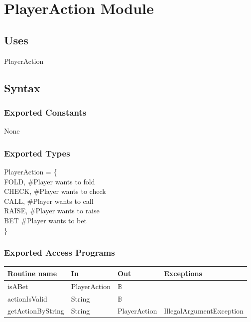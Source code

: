 \documentclass[12pt, titlepage]{article}
\begin{document}
                      
        
\section* {PlayerAction Module}
    \subsection* {Uses}
    PlayerAction
    \subsection* {Syntax}
    
        \subsubsection* {Exported Constants}
            None
        \subsubsection* {Exported Types}
            PlayerAction = \{ \\
            FOLD, \#Player wants to fold \\
            CHECK, \#Player wants to check \\
            CALL, \#Player wants to call \\
            RAISE, \#Player wants to raise \\
            BET \#Player wants to bet \\
            \}

        \subsubsection* {Exported Access Programs}
        
        \begin{tabular}{| l | l | l | p{6cm} |}
            \hline
            \textbf{Routine name} & \textbf{In} & \textbf{Out} & \textbf{Exceptions}\\
            \hline
            isABet & PlayerAction & $\mathbb{B}$ & \\
            \hline
            actionIsValid & String & $\mathbb{B}$ & \\
            \hline
            getActionByString & String & PlayerAction &  IllegalArgumentException\\
            \hline 
        \end{tabular}
        
\end{document}
